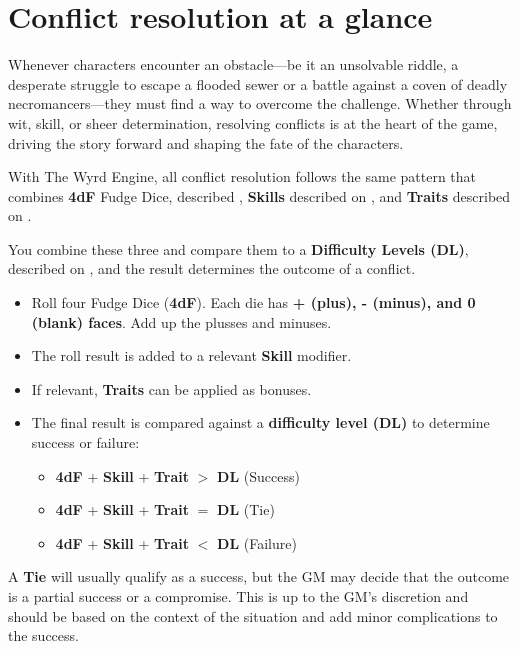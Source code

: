 \section{Conflict resolution at a glance}

Whenever characters encounter an obstacle—be it an unsolvable riddle, a desperate struggle to escape a flooded sewer or a battle against a coven of deadly necromancers—they must find a way to overcome the challenge. Whether through wit, skill, or sheer determination, resolving conflicts is at the heart of the game, driving the story forward and shaping the fate of the characters.

With The Wyrd Engine, all conflict resolution follows the same pattern that combines \textbf{4dF} Fudge Dice, described , \textbf{Skills} described on , and \textbf{Traits} described on .

You combine these three and compare them to a \textbf{Difficulty Levels (DL)}, described on , and the result determines the outcome of a conflict.

\begin{Example}
	\begin{itemize}
		\item Roll four Fudge Dice (\textbf{4dF}).
		      Each die has \textbf{+ (plus), - (minus), and 0 (blank) faces}. Add up the plusses and minuses.
		\item The roll result is added to a relevant \textbf{Skill} modifier.
		\item If relevant, \textbf{Traits} can be applied as bonuses.
		\item The final result is compared against a \textbf{difficulty level (DL)} to determine success or failure:
		\begin{itemize}
			\item \textbf{4dF} + \textbf{Skill} + \textbf{Trait} $>$ \textbf{DL} (Success)	
			\item \textbf{4dF} + \textbf{Skill} + \textbf{Trait} $=$ \textbf{DL} (Tie)
			\item \textbf{4dF} + \textbf{Skill} + \textbf{Trait} $<$ \textbf{DL} (Failure)
		\end{itemize}
	\end{itemize}
\end{Example}

A \textbf{Tie} will usually qualify as a success, but the GM may decide that the outcome is a partial success or a compromise. This is up to the GM's discretion and should be based on the context of the situation and add minor complications to the success.

